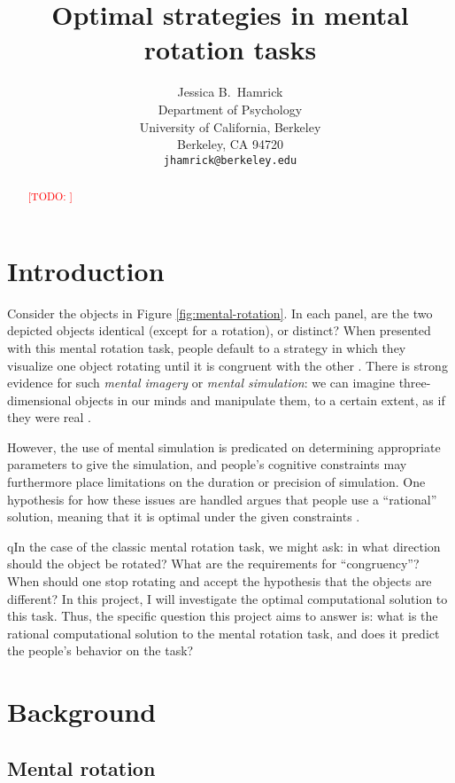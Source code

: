 \documentclass{article} %
\title{Optimal strategies in mental rotation tasks}
\author{Jessica B.~Hamrick\\
  Department of Psychology\\
  University of California, Berkeley\\
  Berkeley, CA 94720\\
  \texttt{jhamrick@berkeley.edu}}
\newcommand{\TODO}[1]{\textcolor{red}{[TODO: #1]}}
\begin{document}
\maketitle

\begin{abstract}
\TODO{}
\end{abstract}

\section{Introduction}


Consider the objects in Figure \ref{fig:mental-rotation}. In each
panel, are the two depicted objects identical (except for a rotation),
or distinct? When presented with this mental rotation task, people
default to a strategy in which they visualize one object rotating
until it is congruent with the other \cite{Shepard1971}. There is
strong evidence for such \textit{mental imagery} or \textit{mental
  simulation}: we can imagine three-dimensional objects in our minds
and manipulate them, to a certain extent, as if they were real
\cite{Kosslyn:2009tj}.

However, the use of mental simulation is predicated on determining
appropriate parameters to give the simulation, and people's cognitive
constraints may furthermore place limitations on the duration or
precision of simulation. One hypothesis for how these issues are
handled argues that people use a ``rational'' solution, meaning that
it is optimal under the given constraints
\cite{Lieder:2012wg,Vul:2009wy,Griffiths2012a}.

qIn the case of the classic mental rotation task, we might ask: in what
direction should the object be rotated?  What are the requirements for
``congruency''? When should one stop rotating and accept the
hypothesis that the objects are different? In this project, I will
investigate the optimal computational solution to this task. Thus, the
specific question this project aims to answer is: what is the rational
computational solution to the mental rotation task, and does it
predict the people's behavior on the task?

\section{Background}


\subsection{Mental rotation}
\end{document}
